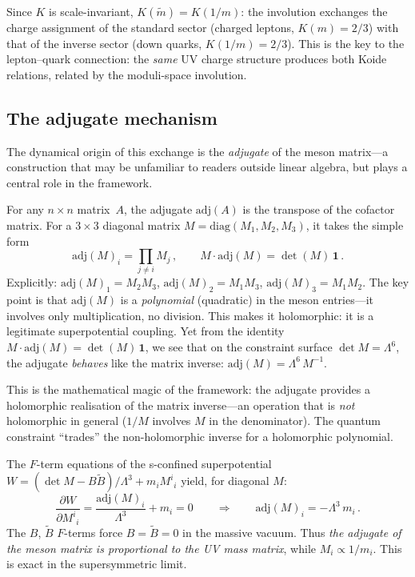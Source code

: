 \documentclass[12pt,a4paper]{article}
\newcommand{\adj}{\mathrm{adj}}
\newcommand{\diag}{\mathrm{diag}}
\begin{document}
Since $K$ is scale-invariant, $K(\tilde{m}) = K(1/m)$: the involution
exchanges the charge assignment of the standard sector (charged leptons,
$K(m)=2/3$) with that of the inverse sector (down quarks,
$K(1/m)=2/3$). This is the key to the lepton--quark connection:
the \emph{same} UV charge structure produces both Koide relations,
related by the moduli-space involution.

\subsection{The adjugate mechanism}

The dynamical origin of this exchange is the \emph{adjugate} of the
meson matrix---a construction that may be unfamiliar to readers
outside linear algebra, but plays a central role in the framework.

For any $n\times n$ matrix~$A$, the adjugate $\adj(A)$ is the
transpose of the cofactor matrix. For a $3\times3$ diagonal
matrix $M = \diag(M_1, M_2, M_3)$, it takes the simple form
\begin{equation}
  \adj(M)_i = \prod_{j \neq i} M_j\,,
  \qquad
  M \cdot \adj(M) = \det(M)\,\mathbf{1}\,.
  \label{eq:adjugate}
\end{equation}
Explicitly: $\adj(M)_1 = M_2 M_3$, $\adj(M)_2 = M_1 M_3$,
$\adj(M)_3 = M_1 M_2$. The key point is that $\adj(M)$ is a
\emph{polynomial} (quadratic) in the meson entries---it involves
only multiplication, no division. This makes it holomorphic: it
is a legitimate superpotential coupling. Yet from the identity
$M \cdot \adj(M) = \det(M)\,\mathbf{1}$, we see that on the
constraint surface $\det M = \Lambda^6$, the adjugate
\emph{behaves} like the matrix inverse:
$\adj(M) = \Lambda^6\,M^{-1}$.

This is the mathematical magic of the framework: the adjugate
provides a holomorphic realisation of the matrix inverse---an
operation that is \emph{not} holomorphic in general ($1/M$ involves
$M$ in the denominator). The quantum constraint ``trades'' the
non-holomorphic inverse for a holomorphic polynomial.

The $F$-term equations of the s-confined superpotential
$W = (\det M - B\tilde B)/\Lambda^3 + m_i M^i{}_i$ yield, for
diagonal $M$:
\begin{equation}
  \frac{\partial W}{\partial M^i{}_i}
  = \frac{\adj(M)_i}{\Lambda^3} + m_i = 0
  \qquad\Longrightarrow\qquad
  \adj(M)_i = -\Lambda^3\,m_i\,.
  \label{eq:Fterm}
\end{equation}
The $B$, $\tilde B$ $F$-terms force $B = \tilde B = 0$ in the massive
vacuum. Thus \emph{the adjugate of the meson matrix is proportional to
the UV mass matrix}, while $M_i \propto 1/m_i$. This is exact in the
supersymmetric limit.
\end{document}
